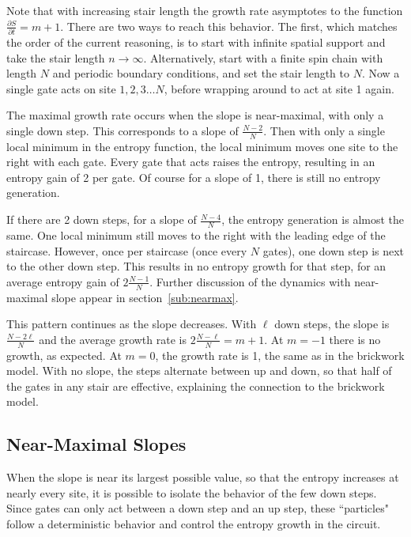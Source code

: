 \documentclass[11pt]{article}
\newcommand{\pd}[2]{\frac{\partial #1}{\partial #2}}
\renewcommand{\l}{\ell}
\begin{document}
Note that with increasing stair length the growth rate asymptotes to the function $\pd{S}{t} = m+1$. There are two ways to reach this behavior. The first, which matches the order of the current reasoning, is to start with infinite spatial support and take the stair length $n\to\infty$. Alternatively, start with a finite spin chain with length $N$ and periodic boundary conditions, and set the stair length to $N$. Now a single gate acts on site $1,2,3\dots N$, before wrapping around to act at site 1 again. 

The maximal growth rate occurs when the slope is near-maximal, with only a single down step. This corresponds to a slope of $\frac{N-2}{N}$. Then with only a single local minimum in the entropy function, the local minimum moves one site to the right with each gate. Every gate that acts raises the entropy, resulting in an entropy gain of 2 per gate. Of course for a slope of 1, there is still no entropy generation.

If there are 2 down steps, for a slope of $\frac{N-4}{N}$, the entropy generation is almost the same. One local minimum still moves to the right with the leading edge of the staircase. However, once per staircase (once every $N$ gates), one down step is next to the other down step. This results in no entropy growth for that step, for an average entropy gain of $2\frac{N-1}{N}$. Further discussion of the dynamics with near-maximal slope appear in section~\ref{sub:nearmax}.

This pattern continues as the slope decreases. With $\l$ down steps, the slope is $\frac{N-2\l}{N}$ and the average growth rate is $2\frac{N-\l}{N} = m+1$. At $m = -1$ there is no growth, as expected. At $m=0$, the growth rate is 1, the same as in the brickwork model. With no slope, the steps alternate between up and down, so that half of the gates in any stair are effective, explaining the connection to the brickwork model.

\subsection{Near-Maximal Slopes} \emph{} \label{sub:nearmax}

When the slope is near its largest possible value, so that the entropy increases at nearly every site, it is possible to isolate the behavior of the few down steps. Since gates can only act between a down step and an up step, these ``particles" follow a deterministic behavior and control the entropy growth in the circuit.
\end{document}
